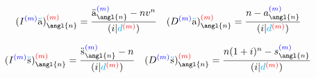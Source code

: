 \documentclass[10pt, french]{article}
\newcommand\cumlaut[2][black]{\stackon[.33ex]{#2}{\textcolor{#1}{\kern-.04ex.\kern-.2ex.}}}
\begin{document}
\begin{multicols*}{3}
\begin{align*}
	(I^{\textcolor{blue}{(m)}}\cumlaut[cyan]{a})_{\angl{n}}^{\textcolor{red}{(m)}} 
		&= \frac{\cumlaut[black]{a}_{\angl{n}}^{\textcolor{blue}{(m)}} - nv^n}{(i | \textcolor{cyan}{d}^{\textcolor{red}{(m)}})} &
	(D^{\textcolor{blue}{(m)}}\cumlaut[cyan]{a})_{\angl{n}}^{\textcolor{red}{(m)}} 
		&= \frac{n - a_{\angl{n}}^{\textcolor{blue}{(m)}}}{(i | \textcolor{cyan}{d}^{\textcolor{red}{(m)}})}
\end{align*}

\begin{align*}
	(I^{\textcolor{blue}{(m)}}\cumlaut[cyan]{s})_{\angl{n}}^{\textcolor{red}{(m)}} 
		&= \frac{\cumlaut[black]{s}_{\angl{n}}^{\textcolor{blue}{(m)}} - n}{(i | \textcolor{cyan}{d}^{\textcolor{red}{(m)}})} &
	(D^{\textcolor{blue}{(m)}}\cumlaut[cyan]{s})_{\angl{n}}^{\textcolor{red}{(m)}} 
		&= \frac{n(1+i)^{n} - s_{\angl{n}}^{\textcolor{blue}{(m)}}}{(i | \textcolor{cyan}{d}^{\textcolor{red}{(m)}})} 
\end{align*}





\end{multicols*}
\end{document}

